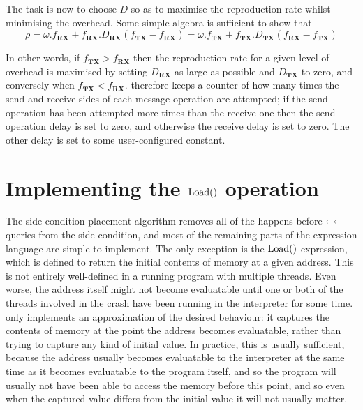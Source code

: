 The task is now to choose $D$ so as to maximise the reproduction
rate whilst minimising the overhead.  Some simple algebra is
sufficient to show that
\begin{displaymath}
\rho = {\omega}.f_{\mathbf{RX}} + f_{\mathbf{RX}}.D_{\mathbf{RX}}(f_{\mathbf{TX}} - f_{\mathbf{RX}}) = {\omega}.f_{\mathbf{TX}} + f_{\mathbf{TX}}.D_{\mathbf{TX}}(f_{\mathbf{RX}} - f_{\mathbf{TX}})
\end{displaymath}

In other words, if $f_{\mathbf{TX}} > f_{\mathbf{RX}}$ then the
reproduction rate for a given level of overhead is maximised by
setting $D_{\mathbf{RX}}$ as large as possible and $D_{\mathbf{TX}}$
to zero, and conversely when $f_{\mathbf{TX}} < f_{\mathbf{RX}}$.
{\Implementation} therefore keeps a counter of how many times the send
and receive sides of each message operation are attempted; if the send
operation has been attempted more times than the receive one then the
send operation delay is set to zero, and otherwise the receive delay
is set to zero.  The other delay is set to some user-configured
constant.


\section{Implementing the $\mathrm{Load}()$ operation}

The side-condition placement algorithm removes
all of the happens-before $\leftarrowtail$ queries from the
side-condition, and most of the remaining parts of the {\StateMachine}
expression language are simple to implement.  The only exception is
the $\mathrm{Load}()$ expression, which is defined to return the initial
contents of memory at a given address.  This is not entirely
well-defined in a running program with multiple threads.  Even worse,
the address itself might not become evaluatable until one or both of
the threads involved in the crash have been running in the interpreter
for some time.  {\Implementation} only implements an approximation of
the desired behaviour: it captures the contents of memory at the point
the address becomes evaluatable, rather than trying to capture any
kind of initial value.  In practice, this is usually sufficient,
because the address usually becomes evaluatable to the interpreter at
the same time as it becomes evaluatable to the program itself, and so
the program will usually not have been able to access the memory
before this point, and so even when the captured value differs from
the initial value it will not usually matter.


